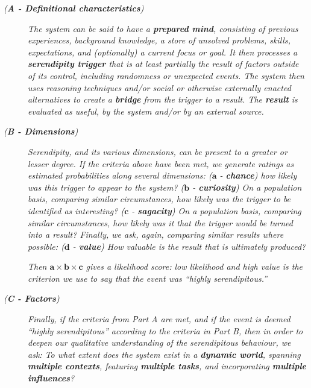 \begin{description}
\item[\emph{(\textbf{A - Definitional characteristics})}] \emph{The
  system can be said to have a \emph{\textbf{prepared mind}},
  consisting of previous experiences, background knowledge, a store of
  unsolved problems, skills, expectations, and (optionally) a current
  focus or goal.  It then processes a \emph{\textbf{serendipity
  trigger}} that is at least partially the result of factors outside
  of its control, including randomness or unexpected events.  The
  system then uses reasoning techniques and/or social or otherwise
  externally enacted alternatives to create a \emph{\textbf{bridge}}
  from the trigger to a result.  The \emph{\textbf{result}} is
  evaluated as useful, by the system and/or by an external source.}
\item[\emph{(\textbf{B - Dimensions})}] \emph{Serendipity, and its
  various dimensions, can be present to a greater or lesser degree.
  If the criteria above have been met, we generate ratings as
  estimated probabilities along several dimensions:
%
\emph{($\mathbf{a}$ - \textbf{chance})} how likely was this trigger to appear to
  the system?
%
\emph{($\mathbf{b}$ - \textbf{curiosity})} On a population basis, comparing
  similar circumstances, how likely was the trigger to be identified
  as interesting?
%
\emph{($\mathbf{c}$ - \textbf{sagacity})} On a population basis, comparing
  similar circumstances, how likely was it that the trigger
  would be turned into a result?
%
Finally, we ask, again, comparing similar results where possible:
\emph{($\mathbf{d}$ - \textbf{value})} How valuable is the result that
is ultimately produced?}

\emph{Then $\mathbf{a}\times\mathbf{b}\times\mathbf{c}$ gives a
  likelihood score: low likelihood and high value is the criterion we use to say that the event was ``highly serendipitous.''}

\item[\emph{(\textbf{C - Factors})}] \emph{Finally, if the criteria
  from Part A are met, and if the event is deemed ``highly
  serendipitous'' according to the criteria in Part B, then in order
  to deepen our qualitative understanding of the serendipitous
  behaviour, we ask: To what extent does the system exist in a
  \emph{\textbf{dynamic world}}, spanning \emph{\textbf{multiple
      contexts}}, featuring \emph{\textbf{multiple tasks}}, and
  incorporating \emph{\textbf{multiple influences}}?}
\end{description}

